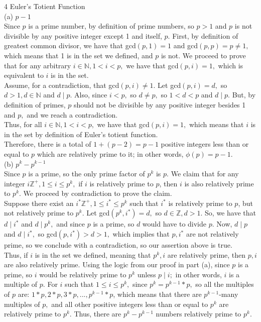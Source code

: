 \documentclass{article}
\begin{document}
{\Large 4 Euler's Totient Function} \\[.5cm]
(a) $p - 1$ \\[.3cm]
\indent Since $p$ is a prime number, by definition of prime numbers, so $p > 1$ and $p$ is not divisible by any positive integer except 1 and itself, $p.$ First, by definition of greatest common divisor, we have that gcd$(p, 1) = 1$ and gcd$(p, p) = p\neq 1,$ which means that 1 is in the set we defined,  and $p$ is not. We proceed to prove that for any arbitrary $i\in\mathbb{N}, 1<i<p,$ we have that gcd$(p, i) = 1,$ which is equivalent to $i$ is in the set. \\[.1cm]
\indent Assume, for a contradiction, that gcd$(p, i)\neq1.$ Let gcd$(p, i) = d,$ so $d > 1, d\in\mathbb{N}$ and $d\mid p.$ Also, since $i < p,$ so $d\neq p,$ so $1 < d < p$ and $d\mid p.$ But, by definition of primes, $p$ should not be divisible by any positive integer besides 1 and $p,$ and we reach a contradiction. \\[.1cm]
\indent Thus, for all $i\in\mathbb{N}, 1<i<p,$ we have that gcd$(p, i) = 1,$ which means that $i$ is in the set by definition of Euler's totient function. \\[.1cm]
\indent Therefore, there is a total of $1 + (p-2) = p - 1$ positive integers less than or equal to $p$ which are relatively prime to it; in other words, $\phi(p) = p - 1.$ \\[.5cm]
(b) $p^k - p^{k-1}$ \\[.3cm]
\indent Since $p$ is a prime, so the only prime factor of $p^k$ is $p.$ We claim that for any integer $i\mathbb{Z^+}, 1\leq i\leq p^k,$ if $i$ is relatively prime to $p$, then $i$ is also relatively prime to $p^k.$ We proceed by contradiction to prove the claim.\\[.1cm]
\indent Suppose there exist an $i^*\mathbb{Z^+}, 1\leq i^*\leq p^k$ such that $i^*$ is relatively prime to $p$, but not relatively prime to $p^k.$ Let gcd$(p^k, i^*) = d,$ so $d\in\mathbb{Z}, d > 1.$ So, we have that $d\mid i^*$ and $d\mid p^k,$ and since $p$ is a prime, so $d$ would have to divide $p.$ Now, $d\mid p$ and $d\mid i^*,$ so gcd$(p, i^*) > d > 1,$ which implies that $p, i^*$ are not relatively prime, so we conclude with a contradiction, so our assertion above is true. \\[.1cm]
\indent Thus, if $i$ is in the set we defined, meaning that $p^k, i$ are relatively prime, then $p, i$ are also relatively prime. Using the logic from our proof in part (a), since $p$ is a prime, so $i$ would be relatively prime to $p^k$ unless $p\mid i;$ in other words, $i$ is a multiple of $p.$ For $i$ such that $1\leq i\leq p^k,$ since $p^k = p^{k-1} * p,$ so all the multiples of $p$ are: $1*p, 2*p, 3*p, ..., p^{k-1}*p$, which means that there are $p^{k-1}$-many multiples of $p,$ and all other positive integers less than or equal to $p^k$ are relatively prime to $p^k.$ Thus, there are $p^k - p^{k-1}$ numbers relatively prime to $p^k.$ \\[.1cm]
\end{document}
